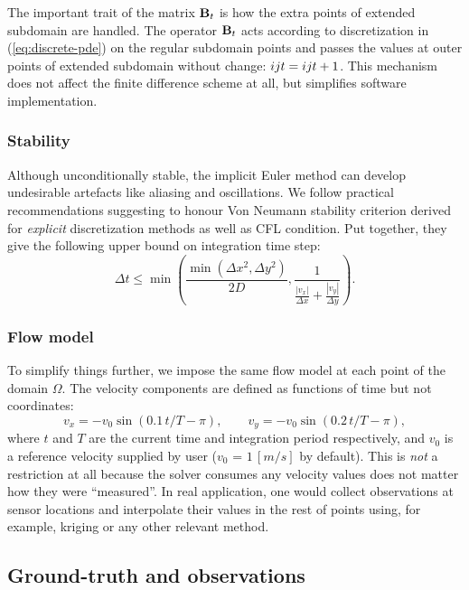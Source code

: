 \documentclass[acmsmall,review,anonymous]{acmart}\settopmatter{printfolios=true,printccs=false,printacmref=false}
\begin{document}
The important trait of the matrix ${\bf B}_t$ is how the extra points of extended subdomain are handled. The operator ${\bf B}_t$ acts according to discretization in (\ref{eq:discrete-pde}) on the regular subdomain points and passes the values at outer points of extended subdomain without change: $\myu{i}{j}{t} = \myu{i}{j}{t+1}$. This mechanism does not affect the finite difference scheme at all, but simplifies software implementation.
\renewcommand{\myu}{}

\subsubsection{Stability}

Although unconditionally stable, the implicit Euler method can develop undesirable artefacts like aliasing and oscillations. We follow practical recommendations suggesting to honour Von Neumann stability criterion derived for \textit{explicit} discretization methods as well as CFL condition. Put together, they give the following upper bound on integration time step:
\begin{equation}
\Delta{t} \le \min\left(
\frac{\min\left(\Delta{x}^2, \Delta{y}^2\right)}{2 D},
\frac{1}{\frac{|v_x|}{\Delta{x}} + \frac{|v_y|}{\Delta{y}}}
\right).
\label{eq:time-step}
\end{equation}

\subsubsection{Flow model}
To simplify things further, we impose the same flow model at each point of the domain $\Omega$. The velocity components are defined as functions of time but not coordinates:
\begin{equation}
v_x = -v_0 \sin{(0.1 \, t / T - \pi)}, \qquad
v_y = -v_0 \sin{(0.2 \, t / T - \pi)},
\label{eq:flow}
\end{equation}
where $t$ and $T$ are the current time and integration period respectively, and $v_0$ is a reference velocity supplied by user ($v_0$ = $1\,[m/s]$ by default). This is \textit{not} a restriction at all because the solver consumes any velocity values does not matter how they were ``measured''. In real application, one would collect observations at sensor locations and interpolate their values in the rest of points using, for example, kriging or any other relevant method.

\subsection{Ground-truth and observations}
\end{document}
